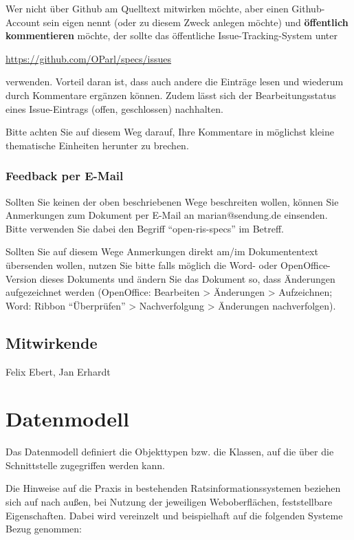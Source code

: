 \documentclass[,a4paper]{article}
\begin{document}
Wer nicht über Github am Quelltext mitwirken möchte, aber einen
Github-Account sein eigen nennt (oder zu diesem Zweck anlegen möchte)
und \textbf{öffentlich kommentieren} möchte, der sollte das öffentliche
Issue-Tracking-System unter

\href{https://github.com/OParl/specs/issues}{https://github.com/OParl/specs/issues}

verwenden. Vorteil daran ist, dass auch andere die Einträge lesen und
wiederum durch Kommentare ergänzen können. Zudem lässt sich der
Bearbeitungsstatus eines Issue-Eintrags (offen, geschlossen) nachhalten.

Bitte achten Sie auf diesem Weg darauf, Ihre Kommentare in möglichst
kleine thematische Einheiten herunter zu brechen.

\subsubsection{Feedback per E-Mail}

Sollten Sie keinen der oben beschriebenen Wege beschreiten wollen,
können Sie Anmerkungen zum Dokument per E-Mail an marian@sendung.de
einsenden. Bitte verwenden Sie dabei den Begriff ``open-ris-specs'' im
Betreff.

Sollten Sie auf diesem Wege Anmerkungen direkt am/im Dokumententext
übersenden wollen, nutzen Sie bitte falls möglich die Word- oder
OpenOffice-Version dieses Dokuments und ändern Sie das Dokument so, dass
Änderungen aufgezeichnet werden (OpenOffice: Bearbeiten \textgreater{}
Änderungen \textgreater{} Aufzeichnen; Word: Ribbon ``Überprüfen''
\textgreater{} Nachverfolgung \textgreater{} Änderungen nachverfolgen).

\subsection{Mitwirkende}

Felix Ebert, Jan Erhardt

\section{Datenmodell}

Das Datenmodell definiert die Objekttypen bzw. die Klassen, auf die über
die Schnittstelle zugegriffen werden kann.

Die Hinweise auf die Praxis in bestehenden Ratsinformationssystemen
beziehen sich auf nach außen, bei Nutzung der jeweiligen Weboberflächen,
feststellbare Eigenschaften. Dabei wird vereinzelt und beispielhaft auf
die folgenden Systeme Bezug genommen:
\end{document}
